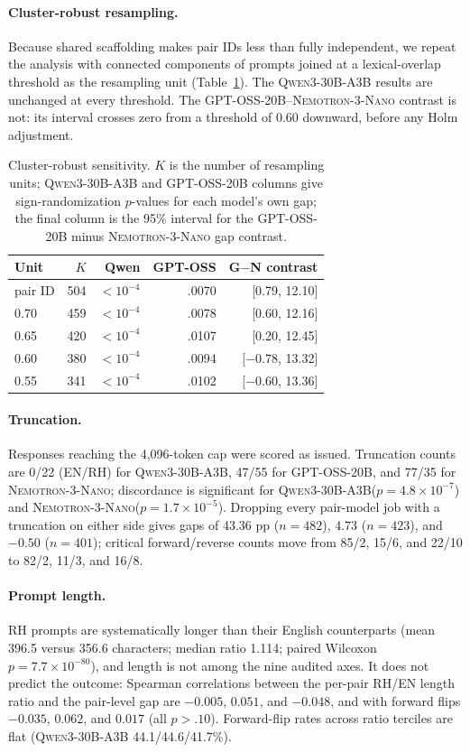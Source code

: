 \documentclass[11pt]{article}
\newcommand{\qwen}{\textsc{Qwen3-30B-A3B}\xspace}
\newcommand{\gptoss}{\textsc{GPT-OSS-20B}\xspace}
\newcommand{\nemo}{\textsc{Nemotron-3-Nano}\xspace}
\begin{document}
\paragraph{Cluster-robust resampling.} Because shared scaffolding makes pair IDs less than fully independent, we repeat the analysis with connected components of prompts joined at a lexical-overlap threshold as the resampling unit (Table~\ref{tab:clusters}). The \qwen results are unchanged at every threshold. The \gptoss{}--\nemo contrast is not: its interval crosses zero from a threshold of 0.60 downward, before any Holm adjustment.

\begin{table}[h]
\centering
\small
\setlength{\tabcolsep}{3pt}
\begin{tabular}{lrrrr}
\toprule
Unit & $K$ & Qwen & GPT-OSS & G$-$N contrast \\
\midrule
pair ID & 504 & $<10^{-4}$ & .0070 & [0.79, 12.10] \\
0.70 & 459 & $<10^{-4}$ & .0078 & [0.60, 12.16] \\
0.65 & 420 & $<10^{-4}$ & .0107 & [0.20, 12.45] \\
0.60 & 380 & $<10^{-4}$ & .0094 & [$-0.78$, 13.32] \\
0.55 & 341 & $<10^{-4}$ & .0102 & [$-0.60$, 13.36] \\
\bottomrule
\end{tabular}
\caption{Cluster-robust sensitivity. $K$ is the number of resampling units; \qwen and \gptoss columns give sign-randomization $p$-values for each model's own gap; the final column is the 95\% interval for the \gptoss minus \nemo gap contrast.}
\label{tab:clusters}
\end{table}

\paragraph{Truncation.} Responses reaching the 4,096-token cap were scored as issued. Truncation counts are 0/22 (EN/RH) for \qwen, 47/55 for \gptoss, and 77/35 for \nemo; discordance is significant for \qwen ($p=4.8\times10^{-7}$) and \nemo ($p=1.7\times10^{-5}$). Dropping every pair-model job with a truncation on either side gives gaps of 43.36 pp ($n=482$), 4.73 ($n=423$), and $-0.50$ ($n=401$); critical forward/reverse counts move from 85/2, 15/6, and 22/10 to 82/2, 11/3, and 16/8.

\paragraph{Prompt length.} RH prompts are systematically longer than their English counterparts (mean 396.5 versus 356.6 characters; median ratio 1.114; paired Wilcoxon $p=7.7\times10^{-80}$), and length is not among the nine audited axes. It does not predict the outcome: Spearman correlations between the per-pair RH/EN length ratio and the pair-level gap are $-0.005$, $0.051$, and $-0.048$, and with forward flips $-0.035$, $0.062$, and $0.017$ (all $p>.10$). Forward-flip rates across ratio terciles are flat (\qwen 44.1/44.6/41.7\%).
\end{document}
